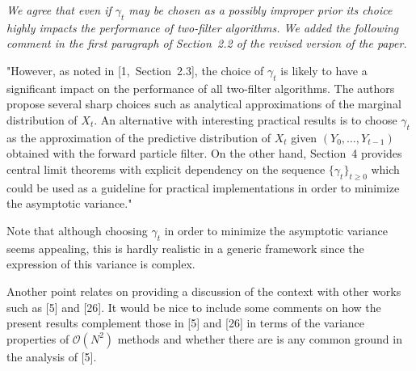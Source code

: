 \documentclass{article}
\begin{document}
{\em
We agree that even if $\gamma_t$ may be chosen as a possibly improper prior its choice highly impacts the performance of two-filter algorithms. We added the following comment in the first paragraph of Section~2.2 of the revised version of the paper.

"However, as noted in [1,~Section~2.3], the choice of $\gamma_t$ is likely to have a significant impact on the performance of all two-filter algorithms. The authors propose several sharp choices such as analytical approximations of the marginal distribution of $X_t$. An alternative with interesting practical results is to choose $\gamma_t$ as the approximation of the predictive distribution of $X_t$ given $(Y_{0},\ldots,Y_{t-1})$ obtained with the forward particle filter. On the other hand, Section~4 provides central limit theorems with explicit dependency on the sequence $\{\gamma_t\}_{t\ge 0}$ which could be used as a guideline for practical implementations in order to minimize the asymptotic variance."

Note that although choosing $\gamma_t$ in order to minimize the asymptotic variance seems appealing, this is hardly realistic in a generic framework since the expression of this variance is complex.  
}

\vspace{1cm}

Another point relates on providing a discussion of the context with other
works such as [5] and [26]. It would be nice to include some comments
on how the present results complement those in [5] and [26] in terms of
the variance properties of $\mathcal{O}(N^2)$ methods and whether there are is any
common ground in the analysis of [5].

\vspace{.5cm}
\end{document}
